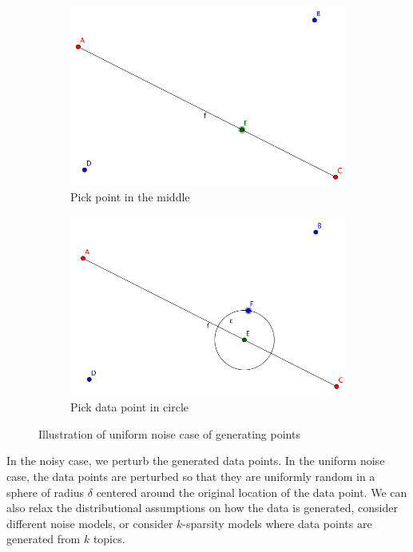 \documentclass[12pt]{article}
\theoremstyle{definition}
\begin{document}
\begin{figure}[!htb]
\begin{subfigure}[b]{.35\linewidth}
\includegraphics[width=\linewidth]{select_point_on_line}
\caption{Pick point in the middle}\label{fig:tiger}
\end{subfigure}\hspace{20 mm}
\begin{subfigure}[b]{.35\linewidth}
\includegraphics[width=\linewidth]{perturbed_data_point}
\caption{Pick data point in circle}\label{fig:tiger}
\end{subfigure}
\caption{Illustration of uniform noise case of generating points}
\label{fig:animals}
\end{figure}

In the noisy case, we perturb the generated data points. In the uniform noise case, the data points are perturbed so that they are uniformly random in a sphere of radius $\delta$ centered around the original location of the data point. We can also relax the distributional assumptions on how the data is generated, consider different noise models, or consider $k$-sparsity models where data points are generated from $k$ topics.
\end{document}
